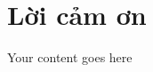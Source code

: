 \documentclass[../main.tex]{subfiles}
\begin{document}
	\chapter*{Lời cảm ơn}

	\justifying

	Your content goes here

	\newpage
\end{document}
